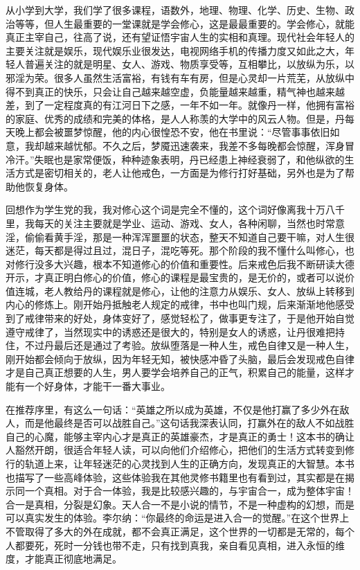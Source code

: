 从小学到大学，我们学了很多课程，语数外，地理、物理、化学、历史、生物、政治等等，但人生最重要的一堂课就是学会修心，这是最最重要的。学会修心，就能真正主宰自己，往高了说，还有望证悟宇宙人生的实相和真理。现代社会年轻人的主要关注就是娱乐，现代娱乐业很发达，电视网络手机的传播力度又如此之大，年轻人普遍关注的就是明星、女人、游戏、物质享受等，互相攀比，以放纵为乐，以邪淫为荣。很多人虽然生活富裕，有钱有车有房，但是心灵却一片荒芜，从放纵中得不到真正的快乐，只会让自己越来越空虚，负能量越来越重，精气神也越来越差，到了一定程度真的有江河日下之感，一年不如一年。就像丹一样，他拥有富裕的家庭、优秀的成绩和完美的体格，是人人称羡的大学中的风云人物。但是，丹每天晚上都会被噩梦惊醒，他的内心很惶恐不安，他在书里说：“尽管事事依旧如意，我却越来越忧郁。不久之后，梦魇迅速袭来，我差不多每晚都会惊醒，浑身冒冷汗。”失眠也是家常便饭，种种迹象表明，丹已经患上神经衰弱了，和他纵欲的生活方式是密切相关的，老人让他戒色，一方面是为修行打好基础，另外也是为了帮助他恢复身体。

回想作为学生党的我，我对修心这个词是完全不懂的，这个词好像离我十万八千里，我每天的关注主要就是学业、运动、游戏、女人，各种闲聊，当然也时常意淫，偷偷看黄手淫，那是一种浑浑噩噩的状态，整天不知道自己要干嘛，对人生很迷茫，每天都是得过且过，混日子，混吃等死。那个阶段的我不懂什么叫修心，也对修行没多大兴趣，根本不知道修心的价值和重要性。后来戒色后我不断研读大德开示，才真正明白修心的价值，修心的课程是最宝贵的，是无价的，或者可以说价值连城，老人教给丹的课程就是修心，让他的注意力从娱乐、女人、放纵上转移到内心的修炼上。刚开始丹抵触老人规定的戒律，书中也叫门规，后来渐渐地他感受到了戒律带来的好处，身体变好了，感觉轻松了，做事更专注了，于是他开始自觉遵守戒律了，当然现实中的诱惑还是很大的，特别是女人的诱惑，让丹很难把持住，不过丹最后还是通过了考验。放纵堕落是一种人生，戒色自律又是一种人生，刚开始都会倾向于放纵，因为年轻无知，被快感冲昏了头脑，最后会发现戒色自律才是自己真正想要的人生，男人要学会培养自己的正气，积累自己的能量，这样才能有一个好身体，才能干一番大事业。

在推荐序里，有这么一句话：“英雄之所以成为英雄，不仅是他打赢了多少外在敌人，而是他最终是否可以战胜自己。”这句话我深表认同，打赢外在的敌人不如战胜自己的心魔，能够主宰内心才是真正的英雄豪杰，才是真正的勇士！这本书的确让人豁然开朗，很适合年轻人读，可以向他们介绍修心，把他们的生活方式转变到修行的轨道上来，让年轻迷茫的心灵找到人生的正确方向，发现真正的大智慧。本书也描写了一些高峰体验，这些体验我在其他灵修书籍里也有看到过，其实都是在揭示同一个真相。对于合一体验，我是比较感兴趣的，与宇宙合一，成为整体宇宙！合一是真相，分裂是幻象。天人合一不是小说的情节，不是一种虚构的幻想，而是可以真实发生的体验。李尔纳：“你最终的命运是进入合一的觉醒。”在这个世界上不管取得了多大的外在成就，都不会真正满足，这个世界的一切都是无常的，每个人都要死，死时一分钱也带不走，只有找到真我，亲自看见真相，进入永恒的维度，才能真正彻底地满足。


